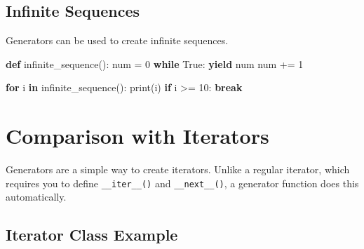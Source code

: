 \documentclass[
  letterpaper,
  DIV=11,
  numbers=noendperiod]{scrreprt}
\newenvironment{Shaded}{\begin{snugshade}}{\end{snugshade}}
\newcommand{\BuiltInTok}[1]{\textcolor[rgb]{0.00,0.23,0.31}{#1}}
\newcommand{\ControlFlowTok}[1]{\textcolor[rgb]{0.00,0.23,0.31}{\textbf{#1}}}
\newcommand{\DecValTok}[1]{\textcolor[rgb]{0.68,0.00,0.00}{#1}}
\newcommand{\KeywordTok}[1]{\textcolor[rgb]{0.00,0.23,0.31}{\textbf{#1}}}
\newcommand{\NormalTok}[1]{\textcolor[rgb]{0.00,0.23,0.31}{#1}}
\newcommand{\OperatorTok}[1]{\textcolor[rgb]{0.37,0.37,0.37}{#1}}
\newcommand{\VariableTok}[1]{\textcolor[rgb]{0.07,0.07,0.07}{#1}}
\begin{document}
\subsection{Infinite Sequences}\label{infinite-sequences}

Generators can be used to create infinite sequences.

\begin{Shaded}
\begin{Highlighting}[]
\KeywordTok{def}\NormalTok{ infinite\_sequence():}
\NormalTok{    num }\OperatorTok{=} \DecValTok{0}
    \ControlFlowTok{while} \VariableTok{True}\NormalTok{:}
        \ControlFlowTok{yield}\NormalTok{ num}
\NormalTok{        num }\OperatorTok{+=} \DecValTok{1}

\ControlFlowTok{for}\NormalTok{ i }\KeywordTok{in}\NormalTok{ infinite\_sequence():}
    \BuiltInTok{print}\NormalTok{(i)}
    \ControlFlowTok{if}\NormalTok{ i }\OperatorTok{\textgreater{}=} \DecValTok{10}\NormalTok{:}
        \ControlFlowTok{break}
\end{Highlighting}
\end{Shaded}

\section{Comparison with Iterators}\label{comparison-with-iterators}

Generators are a simple way to create iterators. Unlike a regular
iterator, which requires you to define \texttt{\_\_iter\_\_()} and
\texttt{\_\_next\_\_()}, a generator function does this automatically.

\subsection{Iterator Class Example}\label{iterator-class-example}
\end{document}
